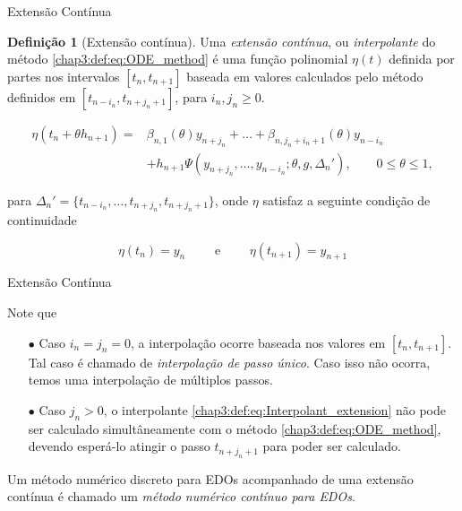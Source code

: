 \documentclass{beamer}
\theoremstyle{plain}
\theoremstyle{definition}
\newtheorem{defi}{Definição}
\begin{document}
\begin{frame}{Extensão Contínua}


    \small
    \begin{defi}[Extensão contínua]
        Uma \textit{extensão contínua}, ou \textit{interpolante} do método \eqref{chap3:def:eq:ODE_method} é uma função polinomial $\eta(t)$ definida por partes nos intervalos $[t_n, t_{n+1}]$ baseada em valores calculados pelo método definidos em $[t_{n - i_n}, t_{n+j_n + 1}]$, para $i_n, j_n \geq 0$. 

        \begin{equation}
            \begin{split}
                \eta(t_n + \theta h_{n+1}) = &\beta_{n, 1} (\theta) y_{n + j_n} + \dots + \beta_{n, j_n + i_n + 1}(\theta) y_{n - i_n} \\
                                             &+ h_{n+1} \Psi(y_{n+j_n}, \dots, y_{n-i_n}; \theta, g, \Delta _n '), \qquad 0 \leq \theta \leq 1,
                                             \label{chap3:def:eq:Interpolant_extension}
            \end{split}
        \end{equation}

        \noindent
        para $\Delta _n ' = \{ t_{n - i_n} , \dots, t_{n+j_n}, t_{n +j_n + 1} \}$, onde $\eta$ satisfaz a seguinte condição de continuidade

        \begin{equation}
            \eta(t_n) = y_n \qquad  \text{ e } \qquad \eta(t_{n+1}) = y_{n+1}
            \label{chap3:def:eq:continuity_condition}
        \end{equation}

    \end{defi}

\end{frame}
 


\begin{frame}{Extensão Contínua}

    Note que

    \begin{itemize}
        \item[$\bullet$] Caso $i_n = j_n = 0$, a interpolação ocorre baseada nos valores em $[t_n, t_{n+1}]$. Tal caso é chamado de \textit{interpolação de passo único}. Caso isso não ocorra, temos uma interpolação de múltiplos passos. 
        \item[$\bullet$] Caso $j_{n} > 0$, o interpolante \eqref{chap3:def:eq:Interpolant_extension} não pode ser calculado simultâneamente com o método \eqref{chap3:def:eq:ODE_method}, devendo esperá-lo atingir o passo $t_{n + j_n + 1}$ para poder ser calculado.
    \end{itemize}


    Um método numérico discreto para EDOs acompanhado de uma extensão contínua é chamado um \textit{método numérico contínuo para EDOs}. 


\end{frame}
\end{document}
